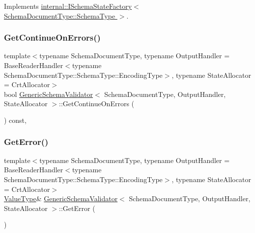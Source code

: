Implements \hyperlink{classinternal_1_1ISchemaStateFactory_a27bd2138940cac3c330dd8399c49b22b}{internal\+::\+I\+Schema\+State\+Factory$<$ Schema\+Document\+Type\+::\+Schema\+Type $>$}.

\mbox{\label{classGenericSchemaValidator_a9f679277e023babf6a62ef8087ffd459}} 
\subsubsection{\texorpdfstring{Get\+Continue\+On\+Errors()}{GetContinueOnErrors()}}
{\footnotesize\ttfamily template$<$typename Schema\+Document\+Type, typename Output\+Handler = Base\+Reader\+Handler$<$typename Schema\+Document\+Type\+::\+Schema\+Type\+::\+Encoding\+Type$>$, typename State\+Allocator = Crt\+Allocator$>$ \\
bool \hyperlink{classGenericSchemaValidator}{Generic\+Schema\+Validator}$<$ Schema\+Document\+Type, Output\+Handler, State\+Allocator $>$\+::Get\+Continue\+On\+Errors (\begin{DoxyParamCaption}{ }\end{DoxyParamCaption}) const\hspace{0.3cm}{\ttfamily [inline]}, {\ttfamily [private]}}

\mbox{\label{classGenericSchemaValidator_a7af476e6940d935efcf79d823c933035}} 
\subsubsection{\texorpdfstring{Get\+Error()}{GetError()}\hspace{0.1cm}{\footnotesize\ttfamily [1/2]}}
{\footnotesize\ttfamily template$<$typename Schema\+Document\+Type, typename Output\+Handler = Base\+Reader\+Handler$<$typename Schema\+Document\+Type\+::\+Schema\+Type\+::\+Encoding\+Type$>$, typename State\+Allocator = Crt\+Allocator$>$ \\
\hyperlink{classGenericSchemaValidator_a435890a2dddeecb896d4ac76de03ca68}{Value\+Type}\& \hyperlink{classGenericSchemaValidator}{Generic\+Schema\+Validator}$<$ Schema\+Document\+Type, Output\+Handler, State\+Allocator $>$\+::Get\+Error (\begin{DoxyParamCaption}{ }\end{DoxyParamCaption})\hspace{0.3cm}{\ttfamily [inline]}}



